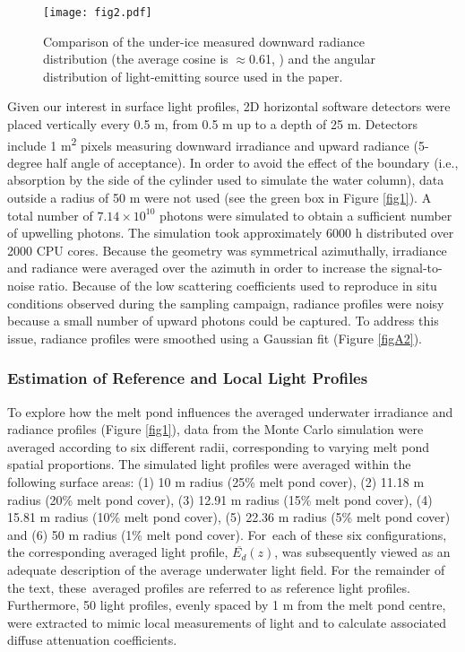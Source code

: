 \documentclass[applsci,article,accept,moreauthors,pdftex,10pt,a4paper]{Definitions/mdpi}
\newcommand{\meanedz}{\ensuremath{{\overline{E_d}(z)}}}
\begin{document}
\begin{figure}[H]
	\centering
	\texttt{[image: fig2.pdf]}
	\caption{Comparison of the under-ice measured downward radiance distribution (the average cosine is $\approx$0.61, \cite{Girard2018}) and the angular distribution of light-emitting source used in the paper.}
	\label{fig2}
\end{figure}




Given our interest in surface light profiles, 2D horizontal software detectors were placed vertically every 0.5 m, from 0.5 m up to a depth of 25 m. Detectors include 1 m\textsuperscript{2} pixels measuring downward irradiance and upward radiance (5-degree half angle of acceptance). In order to avoid the effect of the boundary (i.e., absorption by the side of the cylinder used to simulate the water column), data outside a radius of 50 m were not used (see the green box in Figure \ref{fig1}). A total number of $7.14 \times 10^{10}$ photons were simulated to obtain a sufficient number of upwelling photons. The simulation took approximately 6000 h distributed over 2000 CPU cores. Because the geometry was symmetrical azimuthally, irradiance and radiance were averaged over the azimuth in order to increase the signal-to-noise ratio. Because of the low scattering coefficients used to reproduce in situ conditions observed during the sampling campaign, radiance profiles were noisy because a small number of upward photons could be captured. To address this issue, radiance profiles were smoothed using a Gaussian fit (Figure  \ref{figA2}). 

\subsubsection{Estimation of Reference and Local Light Profiles}

To explore how the melt pond influences the averaged underwater irradiance and radiance profiles (Figure \ref{fig1}), data from the Monte Carlo simulation were averaged according to six different radii, corresponding to varying melt pond spatial proportions. The simulated light profiles were averaged within the following surface areas: (1) 10 m radius (25\% melt pond cover), (2) 11.18 m radius (20\% melt pond cover), (3) 12.91 m radius (15\% melt pond cover), (4) 15.81 m radius (10\% melt pond cover), (5) 22.36 m radius (5\% melt pond cover) and (6) 50 m radius (1\% melt pond cover). For~each of these six configurations, the corresponding averaged light profile, \meanedz{}, was subsequently viewed as an adequate description of the average underwater light field. For the remainder of the text, these~averaged profiles are referred to as reference light profiles. Furthermore, 50 light profiles, evenly spaced by 1 m from the melt pond centre, were extracted to mimic local measurements of light and to calculate associated diffuse attenuation coefficients.
\end{document}
